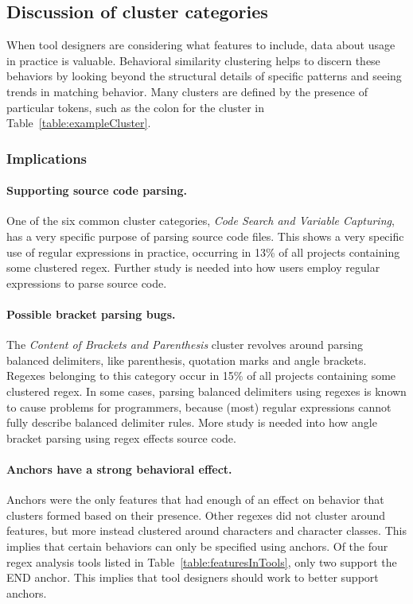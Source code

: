 \subsection{Discussion of cluster categories}
When tool designers are considering what features to include, data about usage in practice is valuable.  Behavioral similarity clustering  helps to discern these behaviors by looking beyond the structural details of specific patterns and seeing trends in  matching behavior. Many clusters are defined by the presence of particular tokens, such as the colon for the cluster in Table~\ref{table:exampleCluster}.

\subsubsection{Implications}

\paragraph{Supporting source code parsing.}  One of the six common cluster categories, \emph{Code Search and Variable Capturing}, has a very specific purpose of parsing source code files. This shows a very specific use of regular expressions in practice, occurring in 13\% of all projects containing some clustered regex.  Further study is needed into how users employ regular expressions to parse source code.

\paragraph{Possible bracket parsing bugs.} The \emph{Content of Brackets and Parenthesis} cluster revolves around parsing balanced delimiters, like parenthesis, quotation marks and angle brackets.  Regexes belonging to this category occur in 15\% of all projects containing some clustered regex.  In some cases, parsing balanced delimiters using regexes is known to cause problems for programmers, because (most) regular expressions cannot fully describe balanced delimiter rules.  More study is needed into how angle bracket parsing using regex effects source code.

\paragraph{Anchors have a strong behavioral effect.}  Anchors were the only features that had enough of an effect on behavior that clusters formed based on their presence.  Other regexes did not cluster around features, but more instead clustered around characters and character classes.  This implies that certain behaviors can only be specified using anchors.  Of the four regex analysis tools listed in Table~\ref{table:featuresInTools}, only two support the END anchor.  This implies that tool designers should work to better support anchors.

